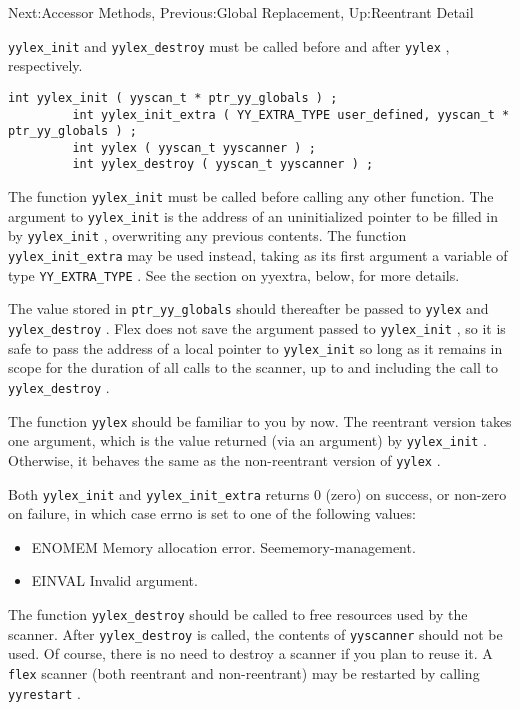 \documentclass[openany,oneside]{book}
\begin{document}
Next:Accessor Methods,
Previous:Global Replacement,
Up:Reentrant Detail

 \verb`yylex_init` and \verb`yylex_destroy` must be called before and
after \verb`yylex` , respectively.
\begin{verbatim}
int yylex_init ( yyscan_t * ptr_yy_globals ) ;
         int yylex_init_extra ( YY_EXTRA_TYPE user_defined, yyscan_t * ptr_yy_globals ) ;
         int yylex ( yyscan_t yyscanner ) ;
         int yylex_destroy ( yyscan_t yyscanner ) ;
\end{verbatim}


The function \verb`yylex_init` must be called before calling any other
function. The argument to \verb`yylex_init` is the address of an
uninitialized pointer to be filled in by \verb`yylex_init` , overwriting
any previous contents. The function \verb`yylex_init_extra` may be used
instead, taking as its first argument a variable of type \verb`YY_EXTRA_TYPE` . 
See the section on yyextra, below, for more details.

The value stored in \verb`ptr_yy_globals` should
thereafter be passed to \verb`yylex` and \verb`yylex_destroy` .  Flex
does not save the argument passed to \verb`yylex_init` , so it is safe to
pass the address of a local pointer to \verb`yylex_init` so long as it remains
in scope for the duration of all calls to the scanner, up to and including
the call to \verb`yylex_destroy` .

The function \verb`yylex` should be familiar to you by now. The reentrant version
takes one argument, which is the value returned (via an argument) by \verb`yylex_init` .  Otherwise, it behaves the same as the non-reentrant
version of \verb`yylex` .

Both \verb`yylex_init` and \verb`yylex_init_extra` returns 0 (zero) on success,
or non-zero on failure, in which case errno is set to one of the following values:
\begin{itemize}
\item ENOMEM
Memory allocation error. Seememory-management.
\item EINVAL
Invalid argument.
\end{itemize}


The function \verb`yylex_destroy` should be
called to free resources used by the scanner. After \verb`yylex_destroy` is called, the contents of \verb`yyscanner` should not be used.  Of
course, there is no need to destroy a scanner if you plan to reuse it. 
A \verb`flex` scanner (both reentrant and non-reentrant) may be
restarted by calling \verb`yyrestart` .
\end{document}
